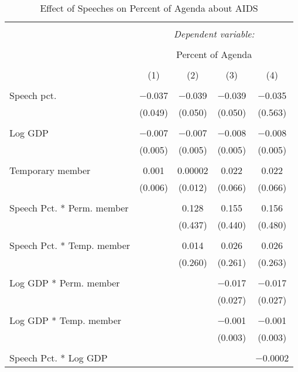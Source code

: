 
\begin{table}[!htbp] \centering 
  \caption{Effect of Speeches on Percent of Agenda about  AIDS} 
  \label{} 
\begin{tabular}{@{\extracolsep{5pt}}lcccc} 
\\[-1.8ex]\hline 
\hline \\[-1.8ex] 
 & \multicolumn{4}{c}{\textit{Dependent variable:}} \\ 
\cline{2-5} 
\\[-1.8ex] & \multicolumn{4}{c}{Percent of Agenda} \\ 
\\[-1.8ex] & (1) & (2) & (3) & (4)\\ 
\hline \\[-1.8ex] 
 Speech pct. & $-$0.037 & $-$0.039 & $-$0.039 & $-$0.035 \\ 
  & (0.049) & (0.050) & (0.050) & (0.563) \\ 
  & & & & \\ 
 Log GDP & $-$0.007 & $-$0.007 & $-$0.008 & $-$0.008 \\ 
  & (0.005) & (0.005) & (0.005) & (0.005) \\ 
  & & & & \\ 
 Temporary member & 0.001 & 0.00002 & 0.022 & 0.022 \\ 
  & (0.006) & (0.012) & (0.066) & (0.066) \\ 
  & & & & \\ 
 Speech Pct. * Perm. member &  & 0.128 & 0.155 & 0.156 \\ 
  &  & (0.437) & (0.440) & (0.480) \\ 
  & & & & \\ 
 Speech Pct. * Temp. member &  & 0.014 & 0.026 & 0.026 \\ 
  &  & (0.260) & (0.261) & (0.263) \\ 
  & & & & \\ 
 Log GDP * Perm. member &  &  & $-$0.017 & $-$0.017 \\ 
  &  &  & (0.027) & (0.027) \\ 
  & & & & \\ 
 Log GDP * Temp. member &  &  & $-$0.001 & $-$0.001 \\ 
  &  &  & (0.003) & (0.003) \\ 
  & & & & \\ 
 Speech Pct. * Log GDP &  &  &  & $-$0.0002 \\ 

\end{tabular}
\end{table}
